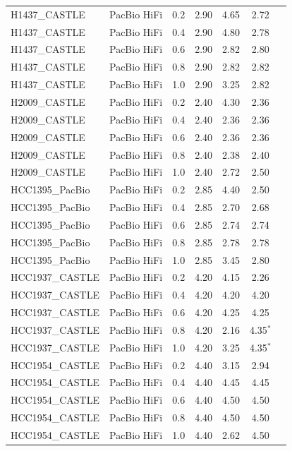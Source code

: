 \documentclass[pdflatex,sn-nature]{sn-jnl}
\begin{document}
\begin{small}
\begin{longtable}{@{}llccccc@{}}
  \addlinespace
  H1437\_CASTLE & PacBio HiFi & 0.2 & 2.90 & 4.65 & 2.72 \\
  H1437\_CASTLE & PacBio HiFi & 0.4 & 2.90 & 4.80 & 2.78 \\
  H1437\_CASTLE & PacBio HiFi & 0.6 & 2.90 & 2.82 & 2.80 \\
  H1437\_CASTLE & PacBio HiFi & 0.8 & 2.90 & 2.82 & 2.82 \\
  H1437\_CASTLE & PacBio HiFi & 1.0 & 2.90 & 3.25 & 2.82 \\
  \addlinespace
  H2009\_CASTLE & PacBio HiFi & 0.2 & 2.40 & 4.30 & 2.36 \\
  H2009\_CASTLE & PacBio HiFi & 0.4 & 2.40 & 2.36 & 2.36 \\
  H2009\_CASTLE & PacBio HiFi & 0.6 & 2.40 & 2.36 & 2.36 \\
  H2009\_CASTLE & PacBio HiFi & 0.8 & 2.40 & 2.38 & 2.40 \\
  H2009\_CASTLE & PacBio HiFi & 1.0 & 2.40 & 2.72 & 2.50 \\
  \addlinespace
  HCC1395\_PacBio & PacBio HiFi & 0.2 & 2.85 & 4.40 & 2.50 \\
  HCC1395\_PacBio & PacBio HiFi & 0.4 & 2.85 & 2.70 & 2.68 \\
  HCC1395\_PacBio & PacBio HiFi & 0.6 & 2.85 & 2.74 & 2.74 \\
  HCC1395\_PacBio & PacBio HiFi & 0.8 & 2.85 & 2.78 & 2.78 \\
  HCC1395\_PacBio & PacBio HiFi & 1.0 & 2.85 & 3.45 & 2.80 \\
  \addlinespace
  HCC1937\_CASTLE & PacBio HiFi & 0.2 & 4.20 & 4.15 & 2.26 \\
  HCC1937\_CASTLE & PacBio HiFi & 0.4 & 4.20 & 4.20 & 4.20 \\
  HCC1937\_CASTLE & PacBio HiFi & 0.6 & 4.20 & 4.25 & 4.25 \\
  HCC1937\_CASTLE & PacBio HiFi & 0.8 & 4.20 & 2.16 & 4.35$^{*}$ \\
  HCC1937\_CASTLE & PacBio HiFi & 1.0 & 4.20 & 3.25 & 4.35$^{*}$ \\
  \addlinespace
  HCC1954\_CASTLE & PacBio HiFi & 0.2 & 4.40 & 3.15 & 2.94 \\
  HCC1954\_CASTLE & PacBio HiFi & 0.4 & 4.40 & 4.45 & 4.45 \\
  HCC1954\_CASTLE & PacBio HiFi & 0.6 & 4.40 & 4.50 & 4.50 \\
  HCC1954\_CASTLE & PacBio HiFi & 0.8 & 4.40 & 4.50 & 4.50 \\
  HCC1954\_CASTLE & PacBio HiFi & 1.0 & 4.40 & 2.62 & 4.50 \\
\end{longtable}
\end{small}
\end{document}
